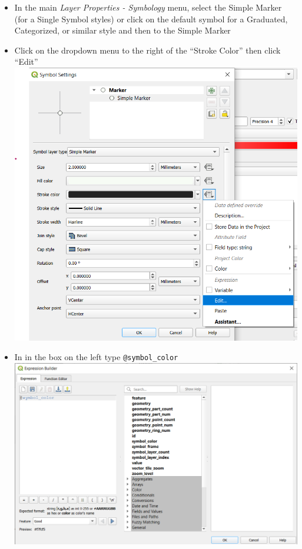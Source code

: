 \documentclass[
  letterpaper,
  DIV=11,
  numbers=noendperiod]{scrreprt}
\providecommand{\tightlist}{%
  \setlength{\itemsep}{0pt}\setlength{\parskip}{0pt}}\usepackage{longtable,booktabs,array}
\begin{document}
\begin{itemize}
\tightlist
\item
  In the main \emph{Layer Properties - Symbology} menu, select the
  Simple Marker (for a Single Symbol styles) or click on the default
  symbol for a Graduated, Categorized, or similar style and then to the
  Simple Marker
\item
  Click on the dropdown menu to the right of the ``Stroke Color'' then
  click ``Edit'' \includegraphics{./images/stroke_color_edit.png}
\item
  In in the box on the left type \texttt{@symbol\_color}
  \includegraphics{./images/symbology_expressionbuilder.png}

\end{itemize}
\end{document}
